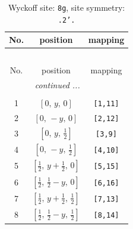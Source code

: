 \documentclass[fleqn,8pt]{jsarticle}
\begin{document}
\begin{longtable}{ccc}
\caption{Wyckoff site: {\tt 8g}, site symmetry: {\tt .2'.}}
 \\
 \hline \hline
No. & position & mapping \\ \hline \endfirsthead

\multicolumn{2}{l}{\tablename\ \thetable{}} \\
 \hline \hline
No. & position & mapping \\ \hline \endhead

 \hline \hline
\multicolumn{2}{r}{\footnotesize\it continued ...} \\ \endfoot

 \hline \hline
\multicolumn{2}{r}{} \\ \endlastfoot

1 & $\left[ 0,\, y,\, 0 \right]$ & {\tt [1,11]} \\ \hline
2 & $\left[ 0,\, - y,\, 0 \right]$ & {\tt [2,12]} \\ \hline
3 & $\left[ 0,\, y,\, \frac{1}{2} \right]$ & {\tt [3,9]} \\ \hline
4 & $\left[ 0,\, - y,\, \frac{1}{2} \right]$ & {\tt [4,10]} \\ \hline
5 & $\left[ \frac{1}{2},\, y + \frac{1}{2},\, 0 \right]$ & {\tt [5,15]} \\ \hline
6 & $\left[ \frac{1}{2},\, \frac{1}{2} - y,\, 0 \right]$ & {\tt [6,16]} \\ \hline
7 & $\left[ \frac{1}{2},\, y + \frac{1}{2},\, \frac{1}{2} \right]$ & {\tt [7,13]} \\ \hline
8 & $\left[ \frac{1}{2},\, \frac{1}{2} - y,\, \frac{1}{2} \right]$ & {\tt [8,14]} \\
\end{longtable}
\renewcommand{\arraystretch}{1.2}
\end{document}
